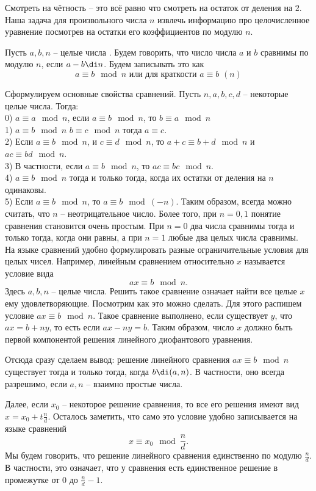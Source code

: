 Смотреть на чётность -- это всё равно что смотреть на остаток от деления на $2$. Наша задача для произвольного числа $n$ извлечь информацию про целочисленное уравнение посмотрев на  остатки его коэффициентов по модулю $n$.

\dfn Пусть $a,b,n$ -- целые числа . Будем говорить, что число числа $a$ и $b$ сравнимы по модулю $n$, если $a-b \di n$. Будем записывать это как
$$a\equiv b \mod n \text{ или для краткости } a\equiv b \,\,(n)$$  
\edfn

Сформулируем основные свойства сравнений. Пусть $n, a,b,c, d$ --  некоторые целые числа. Тогда:\\
0) $a\equiv a \mod n$, если $a\equiv b \mod n$, то $b \equiv a \mod n$\\
1) $a\equiv b \mod n$ $b\equiv c \mod n$ тогда $a\equiv c$.\\
2) Если $a\equiv b \mod n$, и $c\equiv d \mod n$, то $a+c \equiv b+d \mod n$ и $ac\equiv bd \mod n$.\\
3) В частности, если $a\equiv b \mod  n$, то $ac\equiv bc \mod n$.\\
4) $a\equiv b \mod n$ тогда и только тогда, когда их остатки от деления на $n$ одинаковы.\\
5) Если $a\equiv b \mod n$, то $a\equiv b \mod (-n)$. Таким образом, всегда можно считать, что $n$ -- неотрицательное число. Более того, при $n=0,1$ понятие сравнения становится очень простым. При $n=0$ два числа сравнимы тогда и только тогда, когда они равны, а при $n=1$ любые два целых числа сравнимы.\\


На языке сравнений удобно формулировать разные ограничительные условия для целых чисел. Например, линейным сравнением относительно $x$ называется условие вида 
$$ax\equiv b \mod n .$$
Здесь $a,b,n$ -- целые числа. Решить такое сравнение означает найти все целые $x$ ему удовлетворяющие. Посмотрим как это можно сделать. Для этого распишем условие $ax\equiv b \mod n$. Такое сравнение выполнено, если существует $y$, что $ax=b+ny$, то есть если $ax-ny=b$. Таким образом, число $x$ должно быть первой компонентой решения линейного диофантового уравнения. 

Отсюда сразу сделаем вывод: решение линейного сравнения $ax\equiv b \mod n$ существует тогда и только тогда, когда $b \di (a,n)$. В частности, оно всегда разрешимо, если $a,n$ -- взаимно простые числа. 

Далее, если $x_0$ -- некоторое решение сравнения, то все его решения имеют вид $x=x_0+t\frac{n}{d}$. Осталось заметить, что само это условие удобно записывается на языке сравнений
$$x\equiv x_0 \mod \frac{n}{d}.$$ 
Мы будем говорить, что решение линейного сравнения единственно по модулю $\frac{n}{d}$. В частности, это означает, что у сравнения есть единственное решение в промежутке от $0$ до $\frac{n}{d}-1$.



